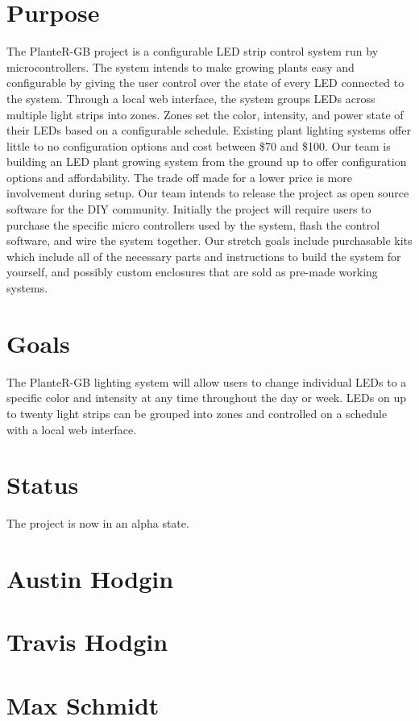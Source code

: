 \documentclass[onecolumn, draftclsnofoot,10pt, compsoc]{IEEEtran}
\begin{document}
	\section{Purpose}
	The PlanteR-GB project is a configurable LED strip control system run by microcontrollers.
	The system intends to make growing plants easy and configurable by giving the user control over the state of every LED connected to the system.
	Through a local web interface, the system groups LEDs across multiple light strips into zones.
	Zones set the color, intensity, and power state of their LEDs based on a configurable schedule.
	Existing plant lighting systems offer little to no configuration options and cost between \$70 and \$100. \cite{expensive1} \cite{expensive2} \cite{expensive3}
	Our team is building an LED plant growing system from the ground up to offer configuration options and affordability.
	The trade off made for a lower price is more involvement during setup. Our team intends to release the project as open source software for the DIY community.
	Initially the project will require users to purchase the specific micro controllers used by the system, flash the control software, and wire the system together.
	Our stretch goals include purchasable kits which include all of the necessary parts and instructions to build the system for yourself, and possibly custom enclosures that are sold as pre-made working systems.

	\section{Goals}
	The PlanteR-GB lighting system will allow users to change individual LEDs to a specific color and intensity at any time throughout the day or week.
	LEDs on up to twenty light strips can be grouped into zones and controlled on a schedule with a local web interface.

	\section{Status}
	The project is now in an alpha state.

	\section{Austin Hodgin}
	\section{Travis Hodgin}
	\section{Max Schmidt}
\end{document}

